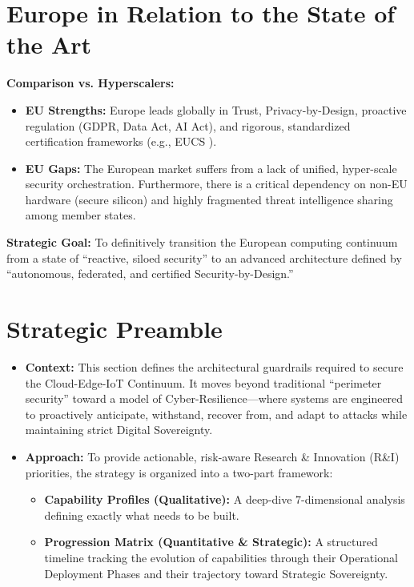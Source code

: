 \documentclass[12pt,a4paper]{report}
\begin{document}
\section{Europe in Relation to the State of the Art}
\textbf{Comparison vs. Hyperscalers:}
\begin{itemize}
    \item \textbf{EU Strengths:} Europe leads globally in Trust, Privacy-by-Design, proactive regulation (GDPR, Data Act, AI Act), and rigorous, standardized certification frameworks (e.g., EUCS \cite{eucs}).
    \item \textbf{EU Gaps:} The European market suffers from a lack of unified, hyper-scale security orchestration. Furthermore, there is a critical dependency on non-EU hardware (secure silicon) and highly fragmented threat intelligence sharing among member states.
\end{itemize}
\textbf{Strategic Goal:} To definitively transition the European computing continuum from a state of ``reactive, siloed security''  to an advanced architecture defined by ``autonomous, federated, and certified Security-by-Design.'' 

\section{Strategic Preamble}
\begin{itemize}
    \item \textbf{Context:} This section defines the architectural guardrails required to secure the Cloud-Edge-IoT Continuum. It moves beyond traditional ``perimeter security''  toward a model of Cyber-Resilience---where systems are engineered to proactively anticipate, withstand, recover from, and adapt to attacks while maintaining strict Digital Sovereignty.
    \item \textbf{Approach:} To provide actionable, risk-aware Research \& Innovation (R\&I) priorities, the strategy is organized into a two-part framework:
    \begin{itemize}
        \item \textbf{Capability Profiles (Qualitative):} A deep-dive 7-dimensional analysis defining exactly what needs to be built.
        \item \textbf{Progression Matrix (Quantitative \& Strategic):} A structured timeline tracking the evolution of capabilities through their Operational Deployment Phases and their trajectory toward Strategic Sovereignty.
    \end{itemize}
\end{itemize}
\end{document}
